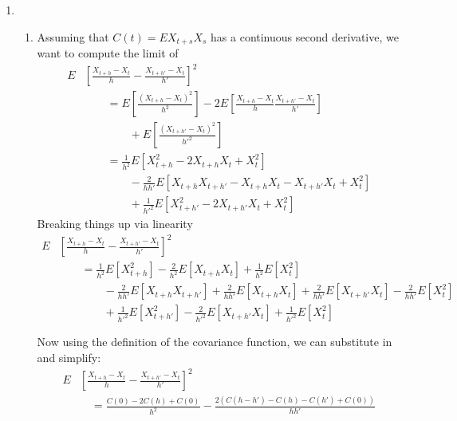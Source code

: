 \documentclass[12pt]{article}
\theoremstyle{plain}
\theoremstyle{definition}
\theoremstyle{remark}
\begin{document}
\begin{enumerate}
  \item %
    \begin{enumerate}
      \item Assuming that $C(t) = EX_{t+s}X_s$ has a continuous second
      derivative, we want to compute the limit of
      \begin{align*}
        E&\left[\frac{X_{t+h}-X_t}{h} - \frac{X_{t+h'}-X_t}{h'}\right]^2 \\
        &\qquad
          = E\left[\frac{\left(X_{t+h}-X_t\right)^2}{h^2}\right]
            - 2E\left[ \frac{X_{t+h}-X_t}{h} \frac{X_{t+h'}-X_t}{h'}\right]\\
          &\qquad\qquad + E\left[\frac{\left(X_{t+h'}-X_t\right)^2}{h'^2}\right]\\
        &\qquad
          =
            \frac{1}{h^2}E\left[X^2_{t+h}-2X_{t+h}X_t+X_t^2\right]\\
          & \qquad\qquad- \frac{2}{hh'}
            E\left[ X_{t+h}X_{t+h'} -X_{t+h} X_t -X_{t+h'}X_t + X_t^2\right]\\
          &\qquad\qquad + \frac{1}{h'^2} E\left[X_{t+h'}^2 - 2X_{t+h'}X_t + X_t^2\right]
      \end{align*}
    Breaking things up via linearity
    \begin{align*}
      E&\left[\frac{X_{t+h}-X_t}{h} - \frac{X_{t+h'}-X_t}{h'}\right]^2 \\
        &\qquad=
          \frac{1}{h^2}E\left[X^2_{t+h}\right]
          -\frac{2}{h^2}E\left[X_{t+h}X_t\right]
          +\frac{1}{h^2}E\left[X_t^2\right]\\
        & \qquad\qquad
          -\frac{2}{hh'}
          E\left[ X_{t+h}X_{t+h'}\right]
          +\frac{2}{hh'}
          E\left[ X_{t+h} X_t\right]
          +\frac{2}{hh'}
          E\left[ X_{t+h'}X_t \right]
          -\frac{2}{hh'}
          E\left[ X_t^2\right]\\
        &\qquad\qquad
          + \frac{1}{h'^2} E\left[X_{t+h'}^2\right]
          - \frac{2}{h'^2} E\left[X_{t+h'}X_t\right]
          + \frac{1}{h'^2} E\left[X_t^2\right]\\\\
    \end{align*}
    Now using the definition of the covariance function, we can
    substitute in and simplify:
    \begin{align*}
      E&\left[\frac{X_{t+h}-X_t}{h} - \frac{X_{t+h'}-X_t}{h'}\right]^2 \\
        & \quad =
          \frac{C(0) - 2C(h) +C(0)}{h^2}
          -\frac{2 (C(h-h') - C(h) - C(h') +C(0))}{hh'}\\

\end{align*}
\end{enumerate}
\end{enumerate}
\end{document}
